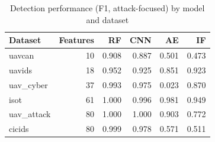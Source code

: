 \begin{table}
\caption{Detection performance (F1, attack-focused) by model and dataset}
\label{tab:f1}
\begin{tabular}{lrrrrr}
\toprule
Dataset & Features & RF & CNN & AE & IF \\
\midrule
uavcan & 10 & 0.908 & 0.887 & 0.501 & 0.473 \\
uavids & 18 & 0.952 & 0.925 & 0.851 & 0.923 \\
uav_cyber & 37 & 0.993 & 0.975 & 0.023 & 0.870 \\
isot & 61 & 1.000 & 0.996 & 0.981 & 0.949 \\
uav_attack & 80 & 1.000 & 1.000 & 0.903 & 0.772 \\
cicids & 80 & 0.999 & 0.978 & 0.571 & 0.511 \\
\bottomrule
\end{tabular}
\end{table}
